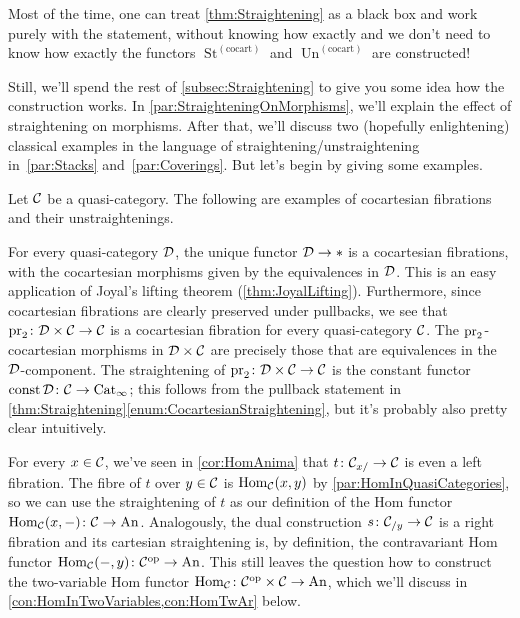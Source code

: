 Most of the time, one can treat \cref{thm:Straightening} as a black box and work purely with the statement, without knowing how exactly and we don't need to know how exactly the functors $\operatorname{St}^{(\mathrm{cocart})}$ and $\operatorname{Un}^{(\mathrm{cocart})}$ are constructed! 

Still, we'll spend the rest of \cref{subsec:Straightening} to give you some idea how the construction works. In \cref{par:StraighteningOnMorphisms}, we'll explain the effect of straightening on morphisms. After that, we'll discuss two (hopefully enlightening) classical examples in the language of straightening/unstraightening in~\cref{par:Stacks} and~\cref{par:Coverings}. But let's begin by giving some examples.
\begin{exm}\label{exm:Straightening}
	Let $\mathcal{C}$ be a quasi-category. The following are examples of cocartesian fibrations and their unstraightenings.
	\begin{alphanumerate}
		\item For every quasi-category $\mathcal{D}$, the unique functor $\mathcal{D}\rightarrow *$ is a cocartesian fibrations, with the cocartesian morphisms given by the equivalences in $\mathcal{D}$. This is an easy application of Joyal's lifting theorem (\cref{thm:JoyalLifting}). Furthermore, since cocartesian fibrations are clearly preserved under pullbacks, we see that $\operatorname{pr}_2\colon \mathcal{D}\times \mathcal{C}\rightarrow\mathcal{C}$ is a cocartesian fibration for every quasi-category $\mathcal{C}$. The $\operatorname{pr}_2$-cocartesian morphisms in $\mathcal{D}\times\mathcal{C}$ are precisely those that are equivalences in the $\mathcal{D}$-component. The straightening of $\operatorname{pr}_2\colon \mathcal{D}\times \mathcal{C}\rightarrow\mathcal{C}$ is the constant functor $\operatorname{const} \mathcal{D}\colon \mathcal{C}\rightarrow \mathrm{Cat}_\infty$; this follows from the pullback statement in \cref{thm:Straightening}\cref{enum:CocartesianStraightening}, but it's probably also pretty clear intuitively.\label{enum:ProjectionsStraightenToConstantFunctors}
		\item For every $x\in \mathcal{C}$, we've seen in \cref{cor:HomAnima} that $t\colon \mathcal{C}_{x/}\rightarrow \mathcal{C}$ is even a left fibration. The fibre of $t$ over $y\in\mathcal{C}$ is $\operatorname{Hom}_{\mathcal{C}}(x,y)$ by \cref{par:HomInQuasiCategories}, so we can use the straightening of $t$ as our definition of the Hom functor $\operatorname{Hom}_{\mathcal{C}}(x,-)\colon \mathcal{C}\rightarrow \mathrm{An}$. Analogously, the dual construction $s\colon \mathcal{C}_{/y}\rightarrow \mathcal{C}$ is a right fibration and its cartesian straightening is, by definition, the contravariant Hom functor $\operatorname{Hom}_{\mathcal{C}}(-,y)\colon \mathcal{C}^{\mathrm{op}}\rightarrow \mathrm{An}$. This still leaves the question how to construct the two-variable Hom functor $\operatorname{Hom}_{\mathcal{C}}\colon \mathcal{C}^{\mathrm{op}}\times\mathcal{C}\rightarrow\mathrm{An}$, which we'll discuss in \cref{con:HomInTwoVariables,con:HomTwAr} below.\label{enum:SliceLeftFibration}

\end{alphanumerate}
\end{exm}
